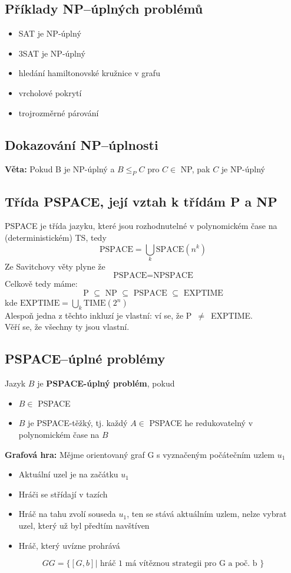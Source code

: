 \documentclass[10pt,a4paper]{article}
\theoremstyle{note}
\begin{document}
	\subsection{Příklady NP--úplných problémů}
		\begin{itemize}
			\item SAT je NP-úplný
			\item 3SAT je NP-úplný
			\item  hledání  hamiltonovské kružnice v grafu
			\item vrcholové pokrytí
			\item trojrozměrné párování
		\end{itemize}

	\subsection{Dokazování NP--úplnosti}

		\textbf{Věta:} Pokud B je NP-úplný a $B \leq_P C$ pro $C \in $ NP, pak $C$ je NP-úplný

	\subsection{Třída PSPACE, její vztah k třídám P a NP}

		PSPACE je třída jazyku, které jsou rozhodnutelné v polynomickém čase na (deterministickém) TS, tedy
		$$\text{PSPACE} = \bigcup_k \text{SPACE}(n^k)$$
		Ze Savitchovy věty plyne že $$\text{PSPACE} = \text{NPSPACE}$$
		Celkově tedy máme:
		$$\text{ P } \subseteq \text{ NP } \subseteq \text{ PSPACE } \subseteq \text{ EXPTIME } $$  kde
		$\text{EXPTIME} = \bigcup_k \text{TIME}(2^n)$\\
		Alespoň jedna z těchto inkluzí je vlastní: ví se, že P~$\neq$~EXPTIME.\\
		Věří se, že všechny ty jsou vlastní.


	\subsection{PSPACE--úplné problémy}

		Jazyk $B$ je \textbf{PSPACE-úplný problém}, pokud
		\begin{itemize}
			\item $B \in$ PSPACE
			\item $B$ je PSPACE-těžký, tj. každý $A \in$ PSPACE he redukovatelný v polynomickém čase na $B$
		\end{itemize}\vspace{3mm}
		\textbf{Grafová hra:} Mějme orientovaný graf G s vyznačeným počátečním uzlem $u_1$
		\begin{itemize}
			\item Aktuální uzel je na začátku $u_1$
			\item Hráči se střídají v tazích
			\item Hráč na tahu zvolí souseda $u_1$, ten se stává aktuálním uzlem, nelze vybrat uzel, který už byl předtím
				navštíven
			\item Hráč, který uvízne prohrává
		\end{itemize}
		$$GG = \{[G,b] | \text{ hráč 1 má vítěznou strategii pro G a poč. b } \}$$\\
\end{document}
